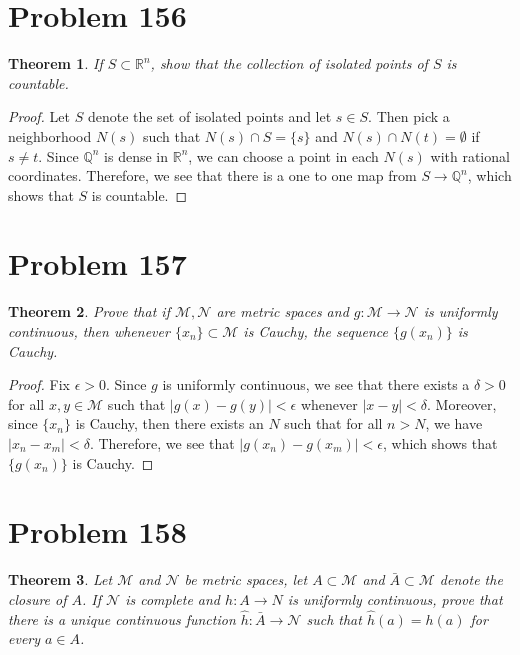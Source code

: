 \documentclass[psamsfonts]{amsart}
\newtheorem{thm}{Theorem}[section]
\theoremstyle{definition}
\theoremstyle{remark}
\numberwithin{equation}{section}
\begin{document}
\section{Problem 156}

\begin{thm}
If $S \subset \mathbb{R}^n$, show that the collection of isolated points of $S$ is countable.
\end{thm}

\begin{proof}
Let $S$ denote the set of isolated points and let $s \in S$. Then pick a neighborhood $N(s)$ such that $N(s) \cap S = \{ s \}$ and $N(s) \cap N(t) = \emptyset$ if $s \neq t$. Since $\mathbb{Q}^n$ is dense in $\mathbb{R}^n$, we can choose a point in each $N(s)$ with rational coordinates. Therefore, we see that there is a one to one map from $S \to \mathbb{Q}^n $, which shows that $S$ is countable.
\end{proof}

\section{Problem 157}

\begin{thm}
Prove that if $\mathscr{M},\mathscr{N}$ are metric spaces and $g: \mathscr{M} \to \mathscr{N}$ is uniformly continuous, then whenever $\{ x_n \} \subset \mathscr{M}$ is Cauchy, the sequence $\{ g(x_n) \}$ is Cauchy.
\end{thm}

\begin{proof}
Fix $\epsilon > 0$. Since $g$ is uniformly continuous, we see that there exists a $\delta > 0$ for all $x,y \in \mathscr{M}$ such that $|g(x) - g(y)| < \epsilon$ whenever $|x - y| < \delta$. Moreover, since $\{ x_n \}$ is Cauchy, then there exists an $N$ such that for all $n > N$, we have $|x_n - x_m| < \delta$. Therefore, we see that $|g(x_n) - g(x_m) | < \epsilon$, which shows that $\{ g(x_n) \}$ is Cauchy.
\end{proof}

\section{Problem 158}

\begin{thm}
Let $\mathscr{M}$ and $\mathscr{N}$ be metric spaces, let $A \subset \mathscr{M}$ and $\bar{A} \subset \mathscr{M}$ denote the closure of $A$. If $\mathscr{N}$ is complete and $h: A \to N$ is uniformly continuous, prove that there is a unique continuous function $\hat{h}: \bar{A} \to \mathscr{N}$ such that $\hat{h}(a) = h(a)$ for every $a \in A$. 
\end{thm}
\end{document}
